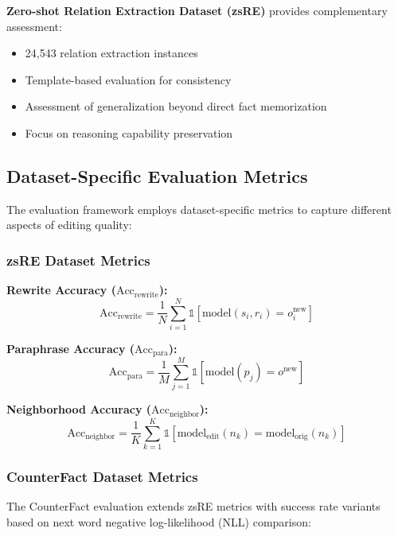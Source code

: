 \textbf{Zero-shot Relation Extraction Dataset (zsRE)} provides complementary assessment:
\begin{itemize}
    \item 24,543 relation extraction instances
    \item Template-based evaluation for consistency
    \item Assessment of generalization beyond direct fact memorization
    \item Focus on reasoning capability preservation
\end{itemize}

\subsection{Dataset-Specific Evaluation Metrics}

The evaluation framework employs dataset-specific metrics to capture different aspects of editing quality:

\subsubsection{zsRE Dataset Metrics}

\textbf{Rewrite Accuracy ($\text{Acc}_{\text{rewrite}}$):}
\begin{equation}
\text{Acc}_{\text{rewrite}} = \frac{1}{N} \sum_{i=1}^{N} \mathbb{1}[\text{model}(s_i, r_i) = o_i^{\text{new}}]
\end{equation}

\textbf{Paraphrase Accuracy ($\text{Acc}_{\text{para}}$):}
\begin{equation}
\text{Acc}_{\text{para}} = \frac{1}{M} \sum_{j=1}^{M} \mathbb{1}[\text{model}(p_j) = o^{\text{new}}]
\end{equation}

\textbf{Neighborhood Accuracy ($\text{Acc}_{\text{neighbor}}$):}
\begin{equation}
\text{Acc}_{\text{neighbor}} = \frac{1}{K} \sum_{k=1}^{K} \mathbb{1}[\text{model}_{\text{edit}}(n_k) = \text{model}_{\text{orig}}(n_k)]
\end{equation}

\subsubsection{CounterFact Dataset Metrics}

The CounterFact evaluation extends zsRE metrics with success rate variants based on next word negative log-likelihood (NLL) comparison:

